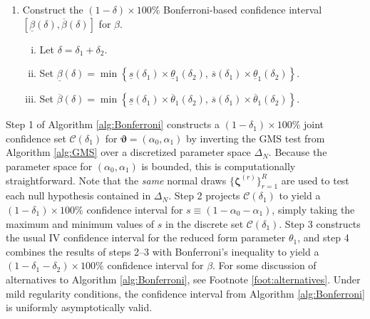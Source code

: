 \begin{alg}
\begin{enumerate}
\begin{enumerate}[(i)]
      \end{enumerate}
    \item Construct the $(1 - \delta)\times 100\%$ Bonferroni-based confidence interval $\left[ \underline{\beta}(\delta), \overline{\beta}(\delta) \right]$ for $\beta$.
      \begin{enumerate}[(i)]
        \item Let $\delta = \delta_1 + \delta_2$.
        \item Set $\underline{\beta}(\delta) = \min \left\{ \underline{s}(\delta_1)\times \underline{\theta}_1(\delta_2),\, \overline{s}(\delta_1)\times \underline{\theta}_1(\delta_2) \right\}$.
        \item Set $\overline{\beta}(\delta) = \min \left\{ \underline{s}(\delta_1)\times \overline{\theta}_1(\delta_2),\, \overline{s}(\delta_1)\times \overline{\theta}_1(\delta_2) \right\}$.
      \end{enumerate}
  \end{enumerate}
  \label{alg:Bonferroni}
\end{alg}

Step 1 of Algorithm \ref{alg:Bonferroni} constructs a $(1 - \delta_1)\times 100\%$ joint confidence set $\mathcal{C}(\delta_1)$ for $\boldsymbol{\vartheta} = (\alpha_0, \alpha_1)$ by inverting the GMS test from Algorithm \ref{alg:GMS} over a discretized parameter space $\Delta_N$.
Because the parameter space for $(\alpha_0, \alpha_1)$ is bounded, this is computationally straightforward.
Note that the \emph{same} normal draws $\{\boldsymbol{\zeta}^{(r)}\}_{r=1}^R$ are used to test each null hypothesis contained in $\Delta_N$.
Step 2 projects $\mathcal{C}(\delta_1)$ to yield a $(1 - \delta_1)\times 100\%$ confidence interval for $s \equiv (1 - \alpha_0 - \alpha_1)$, simply taking the maximum and minimum values of $s$ in the discrete set  $\mathcal{C}(\delta_1)$.
Step 3 constructs the usual IV confidence interval for the reduced form parameter $\theta_1$, and step 4 combines the results of steps 2--3 with Bonferroni's inequality to yield a $(1 - \delta_1 - \delta_2) \times 100\%$ confidence interval for $\beta$.
For some discussion of alternatives to Algorithm \ref{alg:Bonferroni}, see Footnote \ref{foot:alternatives}.
Under mild regularity conditions, the confidence interval from Algorithm \ref{alg:Bonferroni} is uniformly asymptotically valid.


